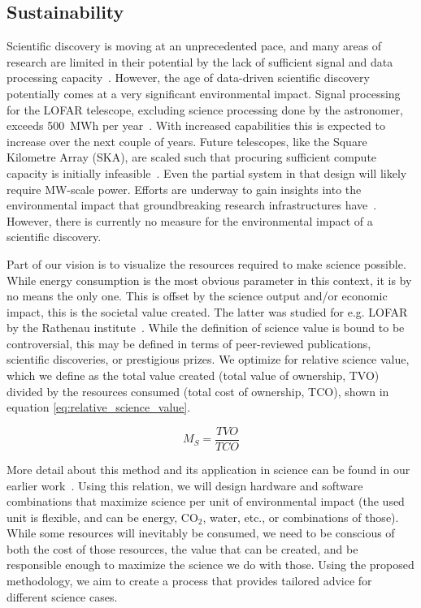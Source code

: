 \documentclass[a4wide,twocolumn]{article}
\begin{document}
\subsection{Sustainability}
Scientific discovery is moving at an unprecedented pace, and many areas of research are limited in their potential by the lack of sufficient signal and data processing capacity~\cite{broekema2012dome}. However, the age of data-driven scientific discovery potentially comes at a very significant environmental impact. Signal processing for the LOFAR telescope, excluding science processing done by the astronomer, exceeds 500~MWh per year~\cite{kruithof_energy_2023}. With increased capabilities this is expected to increase over the next couple of years. Future telescopes, like the Square Kilometre Array (SKA), are scaled such that procuring sufficient compute capacity is initially infeasible~\cite{engbersen2014ska}.  Even the partial system in that design will likely require MW-scale power.  Efforts are underway to gain insights into the environmental impact that groundbreaking research infrastructures have~\cite{kruithof_energy_2023,martin_comprehensive_2022,li_toward_2023}. However, there is currently no measure for the environmental impact of a scientific discovery.

Part of our vision is to visualize the resources required to make science possible.  While energy consumption is the most obvious parameter in this context, it is by no means the only one. This is offset by the science output and/or economic impact, this is the societal value created. The latter was studied for e.g. LOFAR by the Rathenau institute~\cite{tjong_tjin_tai_impact_2019}. While the definition of science value is bound to be controversial, this may be defined in terms of peer-reviewed publications, scientific discoveries, or prestigious prizes. We optimize for relative science value, which we define as the total value created (total value of ownership, TVO) divided by the resources consumed (total cost of ownership, TCO), shown in equation \ref{eq:relative_science_value}.

\begin{equation}
    M_{S} = \frac{TVO}{TCO}
\label{eq:relative_science_value}
\end{equation}

More detail about this method and its application in science can be found in our earlier work~\cite{broekema2020optimising}.  Using this relation, we will design hardware and software combinations that maximize science per unit of environmental impact (the used unit is flexible, and can be energy, CO$_2$, water, etc., or combinations of those). While some resources will inevitably be consumed, we need to be conscious of both the cost of those resources, the value that can be created, and be responsible enough to maximize the science we do with those. Using the proposed methodology, we aim to create a process that provides tailored advice for different science cases.
\end{document}
